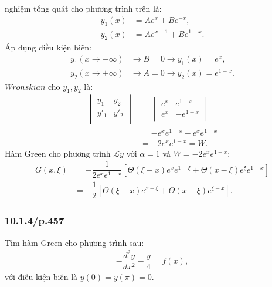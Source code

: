 \documentclass{report}
\newcommand{\f}[2]{\dfrac{#1}{#2}}
\begin{document}
\begin{enumerate}[label=(\alph*)]
	      nghiệm tổng quát cho phương trình trên là:
	      \begin{align*}
		      y_1(x) & = A e^{x} + B e^{-x},    \\
		      y_2(x) & = A e^{x-1} + B e^{1-x}.
	      \end{align*}
	      Áp dụng điều kiện biên:
	      \begin{align*}
		      y_1(x\rightarrow - \infty) & \rightarrow B = 0 \rightarrow y_1(x) = e^{x}  ,  \\
		      y_2(x\rightarrow + \infty) & \rightarrow A = 0 \rightarrow y_2(x) = e^{1-x} .
	      \end{align*}
	      $Wronskian$ cho $y_1,y_2$ là:
	      \begin{align*}
		      \begin{vmatrix}
			      y_1  & y_2  \\
			      y'_1 & y'_2 \\
		      \end{vmatrix}
		       & =
		      \begin{vmatrix}
			      e^{x} & e^{1-x}  \\
			      e^{x} & -e^{1-x} \\
		      \end{vmatrix}                     \\
		       & = - e^{x} e^{1-x} - e^{x} e^{1-x} \\
		       & = -2 e^{x} e^{1-x} = W.
	      \end{align*}
	      Hàm Green cho phương trình $\mathcal{L} y$ với $\alpha = 1$ và $W = -2 e^{x} e^{1-x}$:
	      \begin{align*}
		      G(x,\xi) 
		      &= -\f{1}{2 e^{x} e^{1-x}} \left[ \Theta(\xi - x) e^{x} e^{1-\xi} + \Theta(x - \xi) e^{\xi} e^{1-x} \right] \\
		      & = -\f{1}{2} \left[ \Theta(\xi - x) e^{x-\xi} + \Theta(x - \xi) e^{\xi - x} \right].
	      \end{align*}
\end{enumerate}
\subsubsection{10.1.4/p.457}
Tìm hàm Green cho phương trình sau:
\begin{align*}
	-\dfrac{d^2 y}{dx^2} - \dfrac{y}{4} = f(x),
\end{align*}
với điều kiện biên là $y(0) = y(\pi) = 0$. \\
\end{document}
